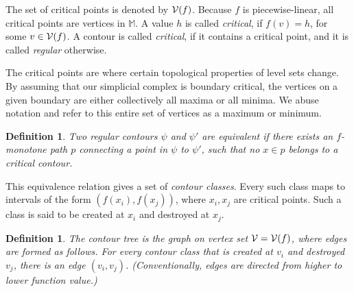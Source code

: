 \documentclass[11pt]{article}
\newtheorem{definition}[theorem]{Definition}
\theoremstyle{definition}
\newcommand{\cV}{{\cal V}}
\newcommand{\MM}{\mathbb{M}}
\begin{document}
% 
% 

The set of critical points is denoted by $\cV(f)$.
Because $f$ is piecewise-linear, all critical points are vertices in $\MM$. 
A value $h$ is called \emph{critical}, if $f(v) = h$, for some $v \in \cV(f)$. 
A contour is called \emph{critical}, if it contains a critical point, and it is called \emph{regular} otherwise.

The critical points are where certain topological properties
 of level sets change.
By assuming that our simplicial complex is boundary critical, the vertices on a given boundary are either collectively all maxima or all minima.  
We abuse notation and refer to this entire set of vertices as a maximum or minimum.


\begin{definition} \label{def:equiv} Two regular contours $\psi$ and $\psi'$ are \emph{equivalent} 
if there exists an $f$-monotone path $p$ connecting a point in $\psi$ to $\psi'$,
such that no $x \in p$ belongs to a critical contour.
\end{definition}

This equivalence relation gives a set of \emph{contour classes}. 
Every such class maps to intervals
of the form $(f(x_i),f(x_j))$, where $x_i, x_j$ are critical points. Such a class is said
to be created at $x_i$ and destroyed at $x_j$. 

\begin{definition} \label{def:tree} The \emph{contour tree} is the graph on vertex set $\cV= \cV(f)$, where
edges are formed as follows. For every contour class that is created at $v_i$ and destroyed $v_j$,
there is an edge $(v_i,v_j)$. (Conventionally, edges are directed from higher to lower function value.)
\end{definition}
\end{document}
